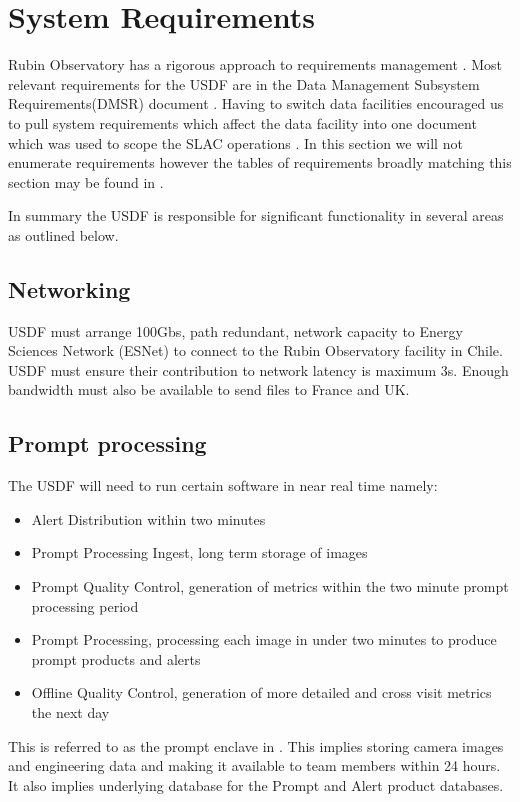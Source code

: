 \section{System Requirements} \label{sec:requirements}

Rubin Observatory has a rigorous approach to requirements management \cite{2016SPIE.9911E..0DS}.
Most relevant requirements for the USDF are in the Data Management Subsystem Requirements(DMSR) document \cite{LSE-61}.
Having to switch data facilities encouraged us to pull system requirements which affect the data facility into one document
which was used to scope the SLAC operations \cite{rtn-080}.
In this section we will not enumerate requirements however the tables of requirements broadly matching this section may be found in \cite{rtn-080}.

In summary the USDF is responsible for significant functionality in several areas as outlined below.


\subsection{Networking } \label{sec:networking}

USDF must arrange 100Gbs, path redundant, network capacity to Energy Sciences Network (ESNet) to connect to the Rubin Observatory facility in Chile.
USDF must ensure their contribution to network latency is maximum 3s.
Enough bandwidth must also be available to send files to France and UK.

\subsection{Prompt processing} \label{sec:prompproc}
The USDF will need to run certain software in near real time namely:
\begin{itemize}
\item Alert Distribution within two minutes
\item Prompt Processing Ingest, long term storage of images
\item Prompt Quality Control, generation of metrics within the two minute prompt processing period
\item Prompt Processing, processing each image in under two minutes to produce prompt products and alerts
\item Offline Quality Control, generation of more detailed and cross visit metrics the next day
\end{itemize}
This is referred to as the prompt enclave in \cite{DMTN-104}.
This implies storing camera images and engineering data and making it available to team members within 24 hours.
It also implies underlying database for the Prompt and Alert product databases.

